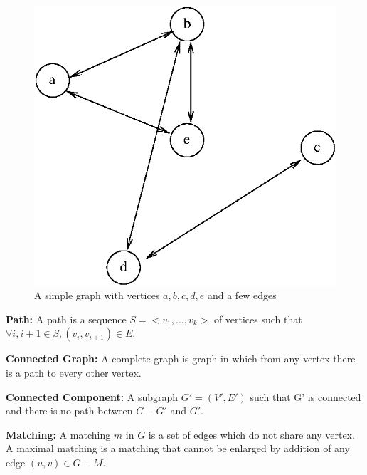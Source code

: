 \documentclass[a4paper,12pt]{article}
\begin{document}
\begin{figure}
\begin{center}
\includegraphics{simple_graph.eps}
\caption{A simple graph with vertices ${a,b,c,d,e}$ and a few edges}
\label{fig:1}
\end{center}
\end{figure}

\begin{dfn}
\textbf{Path:} A path is a sequence $S=<v_1,\dots,v_k>$ of vertices
such that $\forall i,i+1 \in S, {(v_i,v_{i+1}) \in E}$.
\end{dfn}

\begin{dfn}
\textbf{Connected Graph:} A complete graph is graph in which from any
vertex there is a path to every other vertex.
\end{dfn}

\begin{dfn}
\textbf{Connected Component:} A subgraph $G'=(V',E')$ such that
G' is connected and there is no path between $G-G'$ and $G'$.
\end{dfn}

\begin{dfn}
\textbf{Matching:} A matching $m$ in $G$ is a set of edges which do
not share any vertex. A maximal matching is a matching that cannot be
enlarged by addition of any edge $(u,v) \in G-M$.
\end{dfn}
\end{document}

